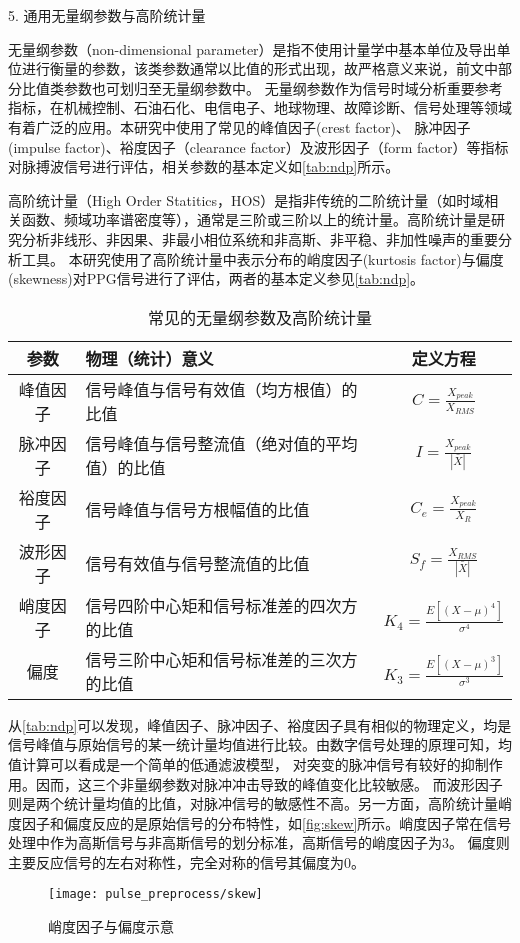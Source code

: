 5. 通用无量纲参数与高阶统计量

无量纲参数（non-dimensional parameter）是指不使用计量学中基本单位及导出单位进行衡量的参数，该类参数通常以比值的形式出现，故严格意义来说，前文中部分比值类参数也可划归至无量纲参数中。
无量纲参数作为信号时域分析重要参考指标，在机械控制、石油石化、电信电子、地球物理、故障诊断、信号处理等领域有着广泛的应用\cite{Jardine2006,Guo2014,Tu2013,Mendel1991}。本研究中使用了常见的峰值因子(crest factor)、
脉冲因子(impulse factor)、裕度因子（clearance factor）及波形因子（form factor）等指标对脉搏波信号进行评估，相关参数的基本定义如\autoref{tab:ndp}所示。

高阶统计量（High Order Statitics，HOS）是指非传统的二阶统计量（如时域相关函数、频域功率谱密度等），通常是三阶或三阶以上的统计量\cite{Zhang2002,Tu2013}。高阶统计量是研究分析非线形、非因果、非最小相位系统和非高斯、非平稳、非加性噪声的重要分析工具。
本研究使用了高阶统计量中表示分布的峭度因子(kurtosis factor)与偏度(skewness)对PPG信号进行了评估，两者的基本定义参见\autoref{tab:ndp}。
\begin{table}[htbp]
    \centering
    \caption{\label{tab:ndp}常见的无量纲参数及高阶统计量}
    \begin{tabularx}{\linewidth}{cX<{\centering}c}
        \toprule
        \textbf{参数}&\textbf{物理（统计）意义}&\textbf{定义方程}\\
        \midrule
        峰值因子&信号峰值与信号有效值（均方根值）的比值& $C=\frac{X_{peak}}{X_{RMS}}$      \\
        脉冲因子&信号峰值与信号整流值（绝对值的平均值）的比值&$I=\frac{X_{peak}}{|\bar{X}|}$      \\
        裕度因子&信号峰值与信号方根幅值的比值&$C_e=\frac{X_{peak}}{X_R}$       \\
        波形因子&信号有效值与信号整流值的比值&$S_f=\frac{X_{RMS}}{|\bar{X}|}$      \\
        峭度因子&信号四阶中心矩和信号标准差的四次方的比值&$K_4=\frac{E[(X-\mu)^4]}{\sigma^4}$      \\
        偏度&信号三阶中心矩和信号标准差的三次方的比值&$K_3=\frac{E[(X-\mu)^3]}{\sigma^3}$      \\
        \bottomrule
    \end{tabularx}
\end{table}

从\autoref{tab:ndp}可以发现，峰值因子、脉冲因子、裕度因子具有相似的物理定义，均是信号峰值与原始信号的某一统计量均值进行比较。由数字信号处理的原理可知，均值计算可以看成是一个简单的低通滤波模型，
对突变的脉冲信号有较好的抑制作用。因而，这三个非量纲参数对脉冲冲击导致的峰值变化比较敏感。
而波形因子则是两个统计量均值的比值，对脉冲信号的敏感性不高。另一方面，高阶统计量峭度因子和偏度反应的是原始信号的分布特性，如\autoref{fig:skew}所示。峭度因子常在信号处理中作为高斯信号与非高斯信号的划分标准，高斯信号的峭度因子为3。
偏度则主要反应信号的左右对称性，完全对称的信号其偏度为0。
\begin{figure}[htbp]
    \centering
    \texttt{[image: pulse\_preprocess/skew]}
    \caption{\label{fig:skew}峭度因子与偏度示意}
\end{figure}


